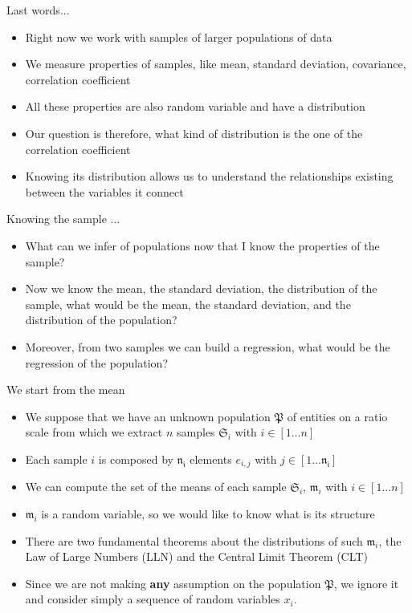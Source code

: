 \documentclass{beamer}
\begin{document}
\begin{frame}
{\centerline{Last words...}}

\begin{itemize}
\item Right now we work with samples of larger populations of data
\item We measure properties of samples, like mean, standard deviation, covariance, correlation coefficient
\item All these properties are also random variable and have a distribution
\item Our question is therefore, what kind of distribution is the one of the correlation coefficient
\item Knowing its distribution allows us to understand the relationships existing between the variables it connect
\end{itemize}


\end{frame}

\begin{frame}
{\centerline{Knowing the sample $\ldots$}}

\begin{itemize}
\item What can we infer of populations now that I know the properties of the sample?
\item Now we know the mean, the standard deviation, the distribution of the sample, what would be the mean, the standard deviation, and the distribution of the population?
\item Moreover, from two samples we can build a regression, what would be the regression of the population? 
\end{itemize}

\end{frame}

\begin{frame}
{\centerline{We start from the mean}}

\begin{itemize}
\item We suppose that we have an unknown population $\mathfrak{P}$ of entities on a ratio scale from which we extract $n$ samples $\mathfrak{S}_i$ with $i \in [1 \ldots{} n]$
\item Each sample $i$ is composed by $\mathfrak{n_i}$ elements $e_{i,j}$ with $j \in [1\ldots{}\mathfrak{n_i}]$
\item We can compute the set of the means of each sample $\mathfrak{S}_i$, $\mathfrak{m}_i$ with $i \in [1 \ldots{} n]$
\item $\mathfrak{m}_i$ is a random variable, so we would like to know what is its structure
\item There are two fundamental theorems about the distributions of such  $\mathfrak{m}_i$, the Law of Large Numbers (LLN) and the Central Limit Theorem (CLT)
\item Since we are not making \textbf{any} assumption on the population  $\mathfrak{P}$, we ignore it and consider simply a sequence of random variables $x_i$.

\end{itemize}


\end{frame}
\end{document}
